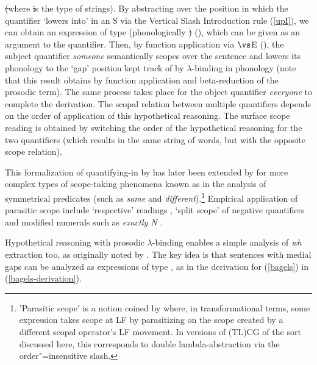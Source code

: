 \documentclass[output=paper]{langsci/langscibook}
\begin{document}
\st\xspace (where \st\xspace is the type of strings).
By abstracting over the position in which the quantifier `lowers
into' in an S via the Vertical Slash Introduction rule (\ref{upI}), we
can obtain an expression of
type  (phonologically \st\xspace \shortarrow \st\xspace) (),
which can be given as an argument to the quantifier. Then, by function
application via $\vs$E (), the subject quantifier \textit{someone}
semantically scopes over the sentence and lowers its phonology to the
`gap' position kept track of by $\lambda$-binding in phonology (note
that this result obtains by function application and beta-reduction of
the prosodic term). The same
process takes place for the object quantifier \textit{everyone} to complete
the derivation.  The scopal
relation between multiple quantifiers depends on the order of
application of this hypothetical reasoning.
The surface scope reading is obtained by switching the order of the 
hypothetical reasoning for the two quantifiers (which results in the
same string of words, but with the opposite scope relation).

This formalization of quantifying-in by \citet{oehrle1994} has later
been extended by \citet{barker07} for more complex types of
scope-taking phenomena known as  in the analysis
of symmetrical predicates (such as \textit{same} and
\textit{different}).\footnote{'Parasitic scope' is a notion coined by
\citet{barker07} where, in transformational terms, some expression
takes scope at LF by parasitizing on the scope created by a different
scopal operator's LF movement. In versions of (TL)CG of the sort
discussed here, this corresponds to double lambda-abstraction via the
order"=insensitive slash.}
Empirical application of parasitic scope include `respective' readings
\citep{kubota-levine-resp},  
`split scope' of negative quantifiers
\citep{kubota-levine-gapping} and modified numerals such as \textit{exactly N}
\citep{pollard-numerical}.

Hypothetical reasoning with prosodic $\lambda$-binding enables a simple
analysis of \textit{wh} extraction too, as originally noted by \citet{muskens03}.
The key idea is that sentences with medial gaps can be analyzed
as expressions  of type , as in the derivation for
(\ref{bagels}) in (\ref{bagels-derivation}).
\end{document}
